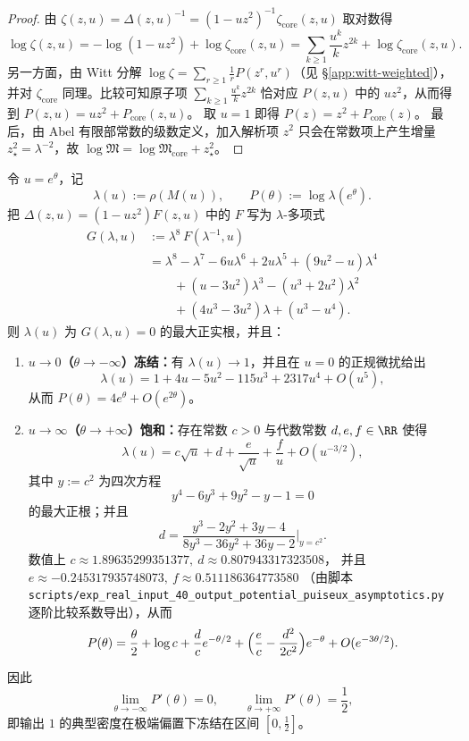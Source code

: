\begin{proof}
由
\(
\zeta(z,u)=\Delta(z,u)^{-1}=(1-uz^2)^{-1}\zeta_{\mathrm{core}}(z,u)
\)
取对数得
\[
\log\zeta(z,u)=-\log(1-uz^2)+\log\zeta_{\mathrm{core}}(z,u)
=\sum_{k\ge 1}\frac{u^k}{k}z^{2k}+\log\zeta_{\mathrm{core}}(z,u).
\]
另一方面，由 Witt 分解 \(\log\zeta=\sum_{r\ge 1}\frac{1}{r}P(z^{r},u^{r})\)（见 \S\ref{app:witt-weighted}），并对 \(\zeta_{\mathrm{core}}\) 同理。比较可知原子项 \(\sum_{k\ge 1}\frac{u^k}{k}z^{2k}\) 恰对应 \(P(z,u)\) 中的 \(u z^2\)，从而得到
\(
P(z,u)=u z^2+P_{\mathrm{core}}(z,u)
\)。
取 \(u=1\) 即得 \(P(z)=z^2+P_{\mathrm{core}}(z)\)。
最后，由 Abel 有限部常数的级数定义，加入解析项 \(z^2\) 只会在常数项上产生增量 \(z_\star^2=\lambda^{-2}\)，故
\(
\log\mathfrak{M}=\log\mathfrak{M}_{\mathrm{core}}+z_\star^2
\)。
\end{proof}

\begin{proposition}\label{prop:real-input-40-pressure-freezing}
令 $u=e^{\theta}$，记
\[
\lambda(u):=\rho(M(u)),\qquad P(\theta):=\log\lambda(e^{\theta}).
\]
把 $\Delta(z,u)=(1-uz^2)F(z,u)$ 中的 $F$ 写为 $\lambda$-多项式
\[
\begin{aligned}
G(\lambda,u)
&:=\lambda^8\,F(\lambda^{-1},u)\\
&=\lambda^8-\lambda^7-6u\lambda^6+2u\lambda^5+(9u^2-u)\lambda^4\\
&\qquad +(u-3u^2)\lambda^3-(u^3+2u^2)\lambda^2\\
&\qquad +(4u^3-3u^2)\lambda+(u^3-u^4).
\end{aligned}
\]
则 $\lambda(u)$ 为 $G(\lambda,u)=0$ 的最大正实根，并且：
\begin{enumerate}
  \item \textbf{$u\to 0$（$\theta\to-\infty$）冻结：}有 $\lambda(u)\to 1$，并且在 $u=0$ 的正规微扰给出
  \[
  \lambda(u)=1+4u-5u^2-115u^3+2317u^4+O(u^5),
  \]
  从而
  \(
  P(\theta)=4e^{\theta}+O(e^{2\theta})
  \)。
  \item \textbf{$u\to\infty$（$\theta\to+\infty$）饱和：}存在常数 $c>0$ 与代数常数 $d,e,f\in\RR$ 使得
  \[
  \lambda(u)=c\sqrt u+d+\frac{e}{\sqrt u}+\frac{f}{u}+O\!\left(u^{-3/2}\right),
  \]
  其中 $y:=c^2$ 为四次方程
  \[
  y^4-6y^3+9y^2-y-1=0
  \]
  的最大正根；并且
  \[
  d=\frac{y^3-2y^2+3y-4}{8y^3-36y^2+36y-2}\Bigg|_{y=c^2}.
  \]
  数值上 $c\approx 1.89635299351377,\ d\approx 0.807943317323508$，
  并且 $e\approx -0.245317935748073,\ f\approx 0.511186364773580$
  （由脚本 \texttt{scripts/exp\_real\_input\_40\_output\_potential\_puiseux\_asymptotics.py} 逐阶比较系数导出），从而
  \[
  P(\theta)=\frac{\theta}{2}+\log c+\frac{d}{c}e^{-\theta/2}
  +\Bigl(\frac{e}{c}-\frac{d^2}{2c^2}\Bigr)e^{-\theta}+O(e^{-3\theta/2}).
  \]
\end{enumerate}
因此
\[
\lim_{\theta\to-\infty}P'(\theta)=0,\qquad \lim_{\theta\to+\infty}P'(\theta)=\frac12,
\]
即输出 $1$ 的典型密度在极端偏置下冻结在区间 $[0,\tfrac12]$。
\end{proposition}

